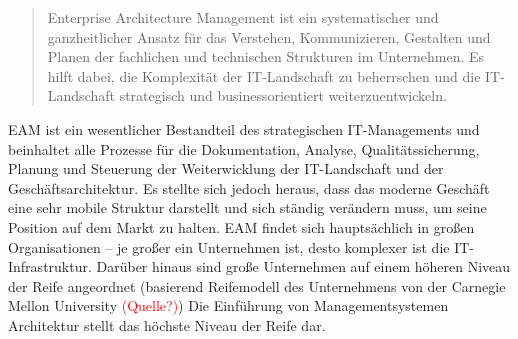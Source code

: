 \documentclass[
	doc,
	a4paper,
	helv
	]{apa6}
\begin{document}
\begin{quote}
\glqq Enterprise Architecture Management ist ein systematischer und ganzheitlicher Ansatz für das Verstehen, Kommunizieren, Gestalten und Planen der fachlichen und technischen Strukturen im Unternehmen. Es hilft dabei, die Komplexität der IT-Landschaft zu beherrschen und die IT-Landschaft strategisch und businessorientiert  weiterzuentwickeln.\grqq
\autocite{Hanschke2016}
\end{quote}

EAM ist ein wesentlicher Bestandteil des strategischen IT-Managements und beinhaltet alle Prozesse für die Dokumentation, Analyse, Qualitätssicherung, Planung und Steuerung der Weiterwicklung der IT-Landschaft und der Geschäftsarchitektur. Es stellte sich jedoch heraus, dass das moderne Geschäft eine sehr mobile Struktur darstellt und sich ständig verändern muss, um seine Position auf dem Markt zu halten. EAM findet sich hauptsächlich in großen Organisationen -- je großer ein Unternehmen ist, desto komplexer ist die IT-Infrastruktur. Darüber hinaus sind große Unternehmen auf einem höheren Niveau der Reife angeordnet (basierend Reifemodell des Unternehmens von der Carnegie Mellon University \textcolor{red}{(Quelle?)}) Die Einführung von Managementsystemen Architektur stellt das höchste Niveau der Reife dar.
\end{document}
